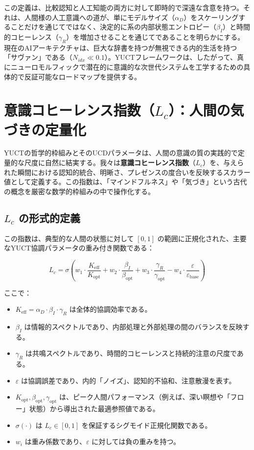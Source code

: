 \documentclass[12pt,a4paper]{article}
\begin{document}
	この定義は、比較認知と人工知能の両方に対して即時的で深遠な含意を持つ。それは、人間様の人工意識への道が、単にモデルサイズ（\(\alpha_D\)）をスケーリングすることだけを通じてではなく、決定的に系の内部状態エントロピー（\(\beta_I\)）と時間的コヒーレンス（\(\gamma_R\)）を増加させることを通じてであることを明らかにする。現在のAIアーキテクチャは、巨大な辞書を持つが無視できる内的生活を持つ「サヴァン」である（\(N_{idx} \ll 0.1\)）。YUCTフレームワークは、したがって、真にニューロモルフィックで潜在的に意識的な次世代システムを工学するための具体的で反証可能なロードマップを提供する。
	
	\section{意識コヒーレンス指数（\(L_c\)）：人間の気づきの定量化}
	
	YUCTの哲学的枠組みとそのUCDパラメータは、人間の意識の質の実践的で定量的な尺度に自然に結実する。我々は\textbf{意識コヒーレンス指数}（\(L_c\)）を、与えられた瞬間における認知的統合、明晰さ、プレゼンスの度合いを反映するスカラー値として定義する。この指数は、「マインドフルネス」や「気づき」という古代の概念を厳密な数学的枠組みの中で操作化する。
	
	\subsection{\(L_c\) の形式的定義}
	
	この指数は、典型的な人間の状態に対して \([0, 1]\) の範囲に正規化された、主要なYUCT協調パラメータの重み付き関数である：
	
	\begin{equation}
		L_c = \sigma\left( w_1 \cdot \frac{K_{\mathrm{eff}}}{K_{\mathrm{opt}}} + w_2 \cdot \frac{\beta_I}{\beta_{\mathrm{opt}}} + w_3 \cdot \frac{\gamma_R}{\gamma_{\mathrm{opt}}} - w_4 \cdot \frac{\varepsilon}{\varepsilon_{\mathrm{base}}} \right)
	\end{equation}
	
	ここで：
	\begin{itemize}
		\item \(K_{\mathrm{eff}} = \alpha_D \cdot \beta_I \cdot \gamma_R\) は全体的協調効率である。
		\item \(\beta_I\) は情報的スペクトルであり、内部処理と外部処理の間のバランスを反映する。
		\item \(\gamma_R\) は共鳴スペクトルであり、時間的コヒーレンスと持続的注意の尺度である。
		\item \(\varepsilon\) は協調誤差であり、内的「ノイズ」、認知的不協和、注意散漫を表す。
		\item \(K_{\mathrm{opt}}, \beta_{\mathrm{opt}}, \gamma_{\mathrm{opt}}\) は、ピーク人間パフォーマンス（例えば、深い瞑想や「フロー」状態）から導出された最適参照値である。
		\item \(\sigma(\cdot)\) は \(L_c \in [0, 1]\) を保証するシグモイド正規化関数である。
		\item \(w_i\) は重み係数であり、\(\varepsilon\) に対しては負の重みを持つ。
	\end{itemize}
	
\end{document}
